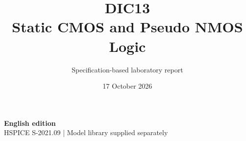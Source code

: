 \documentclass[11pt,a4paper]{article}
\title{\color{accent}DIC13\\[4pt]Static CMOS and Pseudo NMOS Logic}
\author{Specification-based laboratory report}
\date{17 October 2026}
\begin{document}
\maketitle
\begin{center}\small\textbf{English edition}\\
HSPICE S-2021.09 \quad | \quad Model library supplied separately
\end{center}


\end{document}
